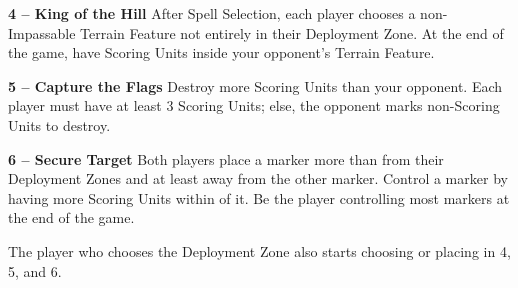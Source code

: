 \documentclass[a4paper,10pt]{article}
\begin{document}
\begin{minipage}[t]{0.32\textwidth}
\textbf{4 -- King of the Hill}\newline
After Spell Selection, each player chooses a non-Impassable Terrain Feature not entirely in their Deployment Zone. At the end of the game, have Scoring Units inside your opponent's Terrain Feature.
\end{minipage}\hfill\begin{minipage}[t]{0.32\textwidth}
\textbf{5 -- Capture the Flags}\newline
Destroy more Scoring Units than your opponent. Each player must have at least 3 Scoring Units; else, the opponent marks non-Scoring Units to destroy.
\end{minipage}\hfill\begin{minipage}[t]{0.32\textwidth}
\textbf{6 -- Secure Target}\newline
Both players place a marker more than  from their Deployment Zones and at least  away from the other marker. Control a marker by having more Scoring Units within  of it. Be the player controlling most markers at the end of the game.
\end{minipage}

The player who chooses the Deployment Zone also starts choosing or placing in 4, 5, and 6.


\newpage

\end{document}
